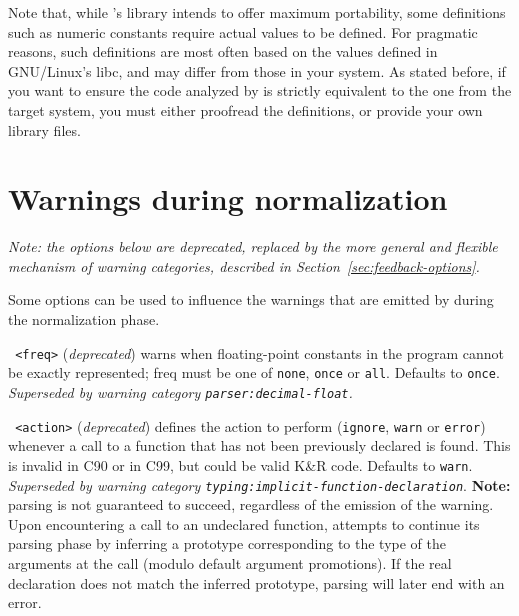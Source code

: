 Note that, while \FramaC's library intends to offer maximum portability, some
definitions such as numeric constants require actual values to be defined.
For pragmatic reasons, such definitions are most often based on the values
defined in GNU/Linux's libc, and may differ from those in your system.
As stated before, if you want to ensure the code analyzed by \FramaC is
strictly equivalent to the one from the target system, you must either
proofread the definitions, or provide your own library files.

\section{Warnings during normalization}\label{sec:warnings-normalize}

\emph{Note: the options below are deprecated, replaced by the more general and
  flexible mechanism of \emph{warning categories}, described in
  Section~\ref{sec:feedback-options}.}

Some options can be used to influence the warnings that are
emitted by \FramaC during the normalization phase.

\begin{description}
\item \texttt{ <freq>}
  (\emph{deprecated}) warns
  when floating-point constants in the program cannot be exactly represented;
  freq must be one of \texttt{none}, \texttt{once} or \texttt{all}.
  Defaults to \texttt{once}.
  \emph{Superseded by warning category \texttt{parser:decimal-float}.}

\item \texttt{ <action>}
  (\emph{deprecated}) defines
  the action to perform (\texttt{ignore}, \texttt{warn} or \texttt{error})
  whenever a call to a function that has not been previously declared is found.
  This is invalid in C90 or in C99, but could be valid K\&R code.
  Defaults to \texttt{warn}.
  \emph{Superseded by warning category \texttt{typing:implicit-function-declaration}}.
  \textbf{Note:} parsing is not guaranteed to succeed, regardless of
  the emission of the warning. Upon encountering a call to an undeclared
  function, \FramaC attempts to continue its parsing
  phase by inferring a prototype corresponding to the type of the
  arguments at the call (modulo default argument promotions).
  If the real declaration does not match the
  inferred prototype, parsing will later end with an error.
\end{description}

